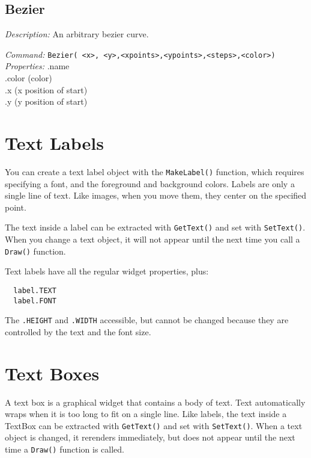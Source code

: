 \subsection{Bezier}
\emph{Description:} An arbitrary bezier curve.

\emph{Command:}  \verb+Bezier( <x>, <y>,<xpoints>,<ypoints>,<steps>,<color>)+\\

\emph{Properties:}
.name\\
.color (color) \\
.x  (x position of start) \\
.y  (y position of start)\\


\section{Text Labels}

You can create a text label object with the \texttt{MakeLabel()} function, 
which requires specifying a font, and the foreground and background colors.  Labels are only a single line of text. Like images, when you move them,
they center on the specified point.

The text inside a label can be extracted with \texttt{GetText()} 
and set with \texttt{SetText()}. When you change a text object, 
it will not appear until the next time you call a \texttt{Draw()} function.

Text labels have all the regular widget properties, plus:
\begin{verbatim}
  label.TEXT 
  label.FONT
\end{verbatim}
  


The \verb+.HEIGHT+ and \verb+.WIDTH+ accessible, but cannot be changed
because they are controlled by the text and the font size.


\section{Text Boxes}

A text box is a graphical widget that contains a body of text.  Text
automatically wraps when it is too long to fit on a single line.  Like
labels, the text inside a TextBox can be extracted with
\texttt{GetText()} and set with \texttt{SetText()}. When a text object
is changed, it rerenders immediately, but does not appear until the
next time a \texttt{Draw()} function is called.


